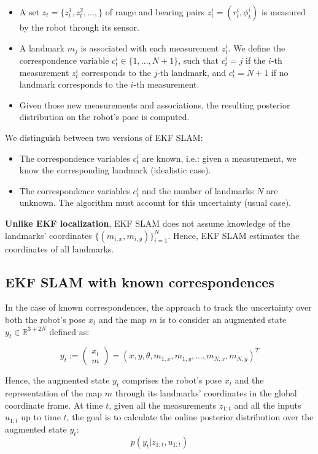 \begin{itemize}
    \item A set $z_t = \{z_t^1, z_t^2,...,\}$ of range and bearing pairs $z_t^i = (r_t^i, \phi_t^i)$ is measured by the robot through its sensor.
    \item A landmark $m_j$ is associated with each measurement $z_t^i$. We define the correspondence variable $c_t^i \in \{1,...,N+1\}$, such that $c_t^i = j$ if the $i$-th measurement $z_t^i$ corresponds to the $j$-th landmark, and $c_t^i = N+1$ if no landmark corresponds to the $i$-th measurement.
    \item Given those new measurements and associations, the resulting posterior distribution on the robot's pose is computed.
\end{itemize}

We distinguish between two versions of EKF SLAM:
\begin{itemize}
    \item The correspondence variables $c_t^i$ are known, i.e.: given a measurement, we know the corresponding landmark (idealistic case).
    \item The correspondence variables $c_t^i$ and the number of landmarks $N$ are unknown. The algorithm must account for this uncertainty (usual case).
\end{itemize}

\textbf{Unlike EKF localization}, EKF SLAM does not assume knowledge of the landmarks' coordinates $\{(m_{i,x}, m_{i,y})\}_{i=1}^N$. Hence, EKF SLAM estimates the coordinates of all landmarks.

\subsection{EKF SLAM with known correspondences}
In the case of known correspondences, the approach to track the uncertainty over both the robot's pose $x_t$ and the map $m$ is to consider an augmented state $y_t \in \mathbb{R}^{3+2N}$ defined as:

\begin{equation}
    y_t := 
    \begin{pmatrix}
    x_t \\
    m
    \end{pmatrix}
    = (x, y, \theta, m_{1,x},m_{1,y},...,m_{N,x},m_{N,y})^T
\end{equation}

Hence, the augmented state $y_t$ comprises the robot's pose $x_t$ and the representation of the map $m$ through its landmarks' coordinates in the global coordinate frame. At time $t$, given all the measurements $z_{1:t}$ and all the inputs $u_{1:t}$ up to time $t$, the goal is to calculate the online posterior distribution over the augmented state $y_t$:
$$p(y_t|z_{1:t}, u_{1:t})$$

